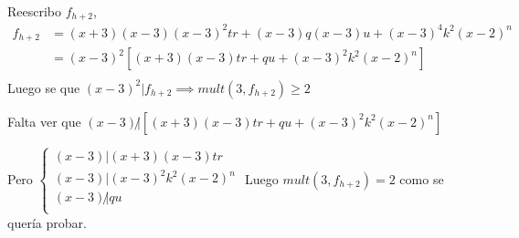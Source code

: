 Reescribo $ f_{h+2}$,
\begin{align*}
    f_{h+2} &= (x+3)(x-3)(x-3)^2tr + (x-3)q(x-3)u + (x-3)^4k^2(x-2)^n \\
    &= (x-3)^2 \left[ (x+3)(x-3)tr + qu + (x-3)^2k^2(x-2)^n \right] \\
\end{align*}
Luego se que $ (x-3)^2 | f_{h+2} \implies mult(3, f_{h+2}) \geq 2 $

Falta ver que $ (x-3) \not | \left[ (x+3)(x-3)tr + qu + (x-3)^2k^2(x-2)^n \right] $

Pero $ \begin{cases}
    (x-3) | (x+3)(x-3)tr \\
    (x-3) | (x-3)^2k^2(x-2)^n \\
    (x-3) \not | qu \\
\end{cases} $
Luego $ mult(3, f_{h+2}) = 2 $ como se quería probar.

